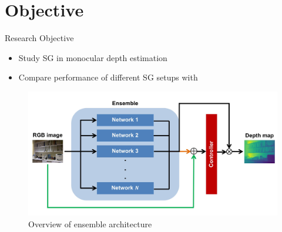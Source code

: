 \documentclass{cubeamer}
\begin{document}
\section{Objective}
\begin{frame}{Research Objective}
    \begin{itemize}
        \item Study SG  in monocular depth estimation
        \item Compare performance of different SG setups with 
    \end{itemize}
    
    \begin{figure}
        \centering
        \includegraphics[width=.7\textwidth]{figures/architecture_overview.jpg}
        \caption{Overview of ensemble architecture}
    \end{figure}
\end{frame}
\end{document}
